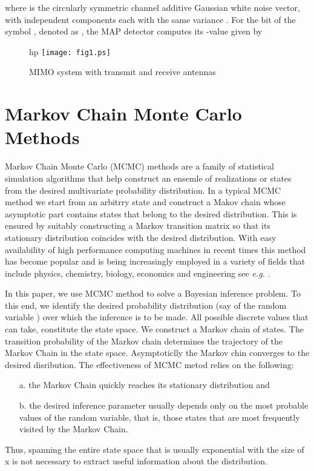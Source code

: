 \documentclass[pre,12pt,aps]{revtex4}
\begin{document}
where  is the circularly symmetric channel additive 
 Gaussian white noise vector, with independent components 
each with the same variance .
For the  bit of the  symbol , 
denoted as , 
the MAP detector computes its  -value given by 
  
\begin{figure}{hp}
\centering
\texttt{[image: fig1.ps]}
\caption{MIMO system with transmit and receive antennas}
\end{figure}
							
\section{Markov Chain Monte Carlo Methods}

Markov Chain Monte Carlo (MCMC) methods are a family of statistical 
simulation algorithms that help construct an ensemle of
realizations or states from the desired multivariate probability 
distribution. In a typical MCMC method we start from an arbitrry
state and construct a Makov chain whose asymptotic part contains
states that belong to the desired distribution. 
This is ensured by suitably constructing a Markov transition
matrix so that its stationary distribution coincides with the 
desired distribution. With easy availability of 
high performance computing
machines in  recent times  this method has  
become popular and is being increasingly employed in a variety
of fields that include physics, chemistry, biology, economics and 
engineering see {\it e.g.} \cite{MC_ref}. 

In this paper, we use MCMC method to solve 
a Bayesian inference problem.  To this end, we identify 
the desired probability distribution (say  of the random 
variable ) over which the inference is to be made. 
All possible discrete values that  can take, constitute the state space.
We construct a Markov chain of states.
The 
transition probability of the Markov chain determines 
the trajectory of the Markov Chain in the state space.
Asymptoticlly the Markov chin converges to the desired disribution. 
The effectiveness of MCMC metod relies on the following:
\begin{itemize}
\item[a.]
the Markov Chain quickly reaches its stationary distribution
and
\item[b.]
the desired inference parameter usually depends only 
on the most probable values of the random variable, 
that is, those states that are most frequently  visited by the Markov Chain.
\end{itemize}
Thus, spanning the entire state space that is 
usually exponential with the size of x is not 
necessary to extract useful information about the 
distribution.
\end{document}
